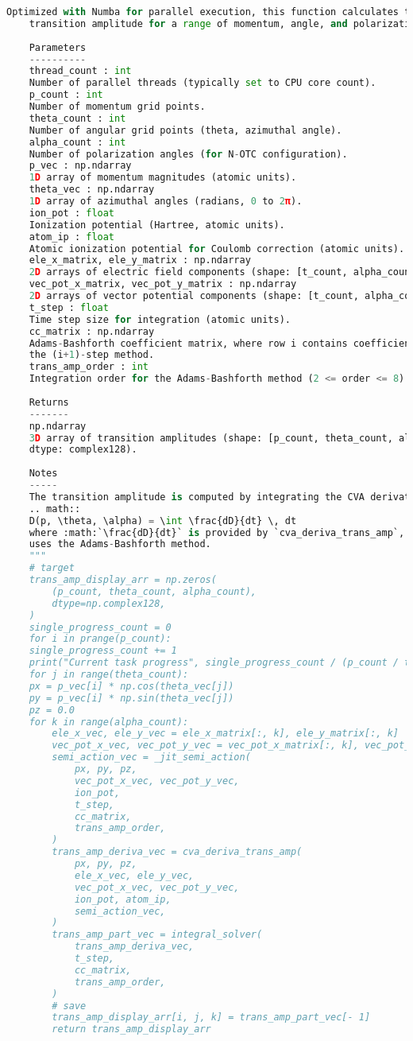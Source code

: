 \begin{lstlisting}[language=Python, caption={非正交激光跃迁振幅求解示范}, label={code:notc cva trans amp}]
	Optimized with Numba for parallel execution, this function calculates the
	transition amplitude for a range of momentum, angle, and polarization parameters.
	
	Parameters
	----------
	thread_count : int
	Number of parallel threads (typically set to CPU core count).
	p_count : int
	Number of momentum grid points.
	theta_count : int
	Number of angular grid points (theta, azimuthal angle).
	alpha_count : int
	Number of polarization angles (for N-OTC configuration).
	p_vec : np.ndarray
	1D array of momentum magnitudes (atomic units).
	theta_vec : np.ndarray
	1D array of azimuthal angles (radians, 0 to 2π).
	ion_pot : float
	Ionization potential (Hartree, atomic units).
	atom_ip : float
	Atomic ionization potential for Coulomb correction (atomic units).
	ele_x_matrix, ele_y_matrix : np.ndarray
	2D arrays of electric field components (shape: [t_count, alpha_count], atomic units).
	vec_pot_x_matrix, vec_pot_y_matrix : np.ndarray
	2D arrays of vector potential components (shape: [t_count, alpha_count], atomic units).
	t_step : float
	Time step size for integration (atomic units).
	cc_matrix : np.ndarray
	Adams-Bashforth coefficient matrix, where row i contains coefficients for
	the (i+1)-step method.
	trans_amp_order : int
	Integration order for the Adams-Bashforth method (2 <= order <= 8).
	
	Returns
	-------
	np.ndarray
	3D array of transition amplitudes (shape: [p_count, theta_count, alpha_count],
	dtype: complex128).
	
	Notes
	-----
	The transition amplitude is computed by integrating the CVA derivative:
	.. math::
	D(p, \theta, \alpha) = \int \frac{dD}{dt} \, dt
	where :math:`\frac{dD}{dt}` is provided by `cva_deriva_trans_amp`, and the integration
	uses the Adams-Bashforth method.
	"""
	# target
	trans_amp_display_arr = np.zeros(
		(p_count, theta_count, alpha_count),
		dtype=np.complex128,
	)
	single_progress_count = 0
	for i in prange(p_count):
	single_progress_count += 1
	print("Current task progress", single_progress_count / (p_count / thread_count))
	for j in range(theta_count):
	px = p_vec[i] * np.cos(theta_vec[j])
	py = p_vec[i] * np.sin(theta_vec[j])
	pz = 0.0
	for k in range(alpha_count):
		ele_x_vec, ele_y_vec = ele_x_matrix[:, k], ele_y_matrix[:, k]
		vec_pot_x_vec, vec_pot_y_vec = vec_pot_x_matrix[:, k], vec_pot_y_matrix[:, k]
		semi_action_vec = _jit_semi_action(
			px, py, pz,
			vec_pot_x_vec, vec_pot_y_vec,
			ion_pot,
			t_step,
			cc_matrix,
			trans_amp_order,
		)
		trans_amp_deriva_vec = cva_deriva_trans_amp(
			px, py, pz,
			ele_x_vec, ele_y_vec,
			vec_pot_x_vec, vec_pot_y_vec,
			ion_pot, atom_ip,
			semi_action_vec,
		)
		trans_amp_part_vec = integral_solver(
			trans_amp_deriva_vec,
			t_step,
			cc_matrix,
			trans_amp_order,
		)
		# save
		trans_amp_display_arr[i, j, k] = trans_amp_part_vec[- 1]
		return trans_amp_display_arr
	

\end{lstlisting}

